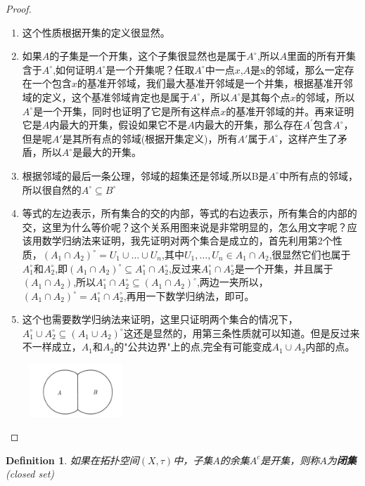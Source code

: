 \documentclass{article}
\newtheorem{definition}[theorem]{Definition}
\begin{document}
\begin{proof}
\begin{enumerate}
	\item 这个性质根据开集的定义很显然。
	\item 如果$A$的子集是一个开集，这个子集很显然也是属于$A^{\circ}$,所以$A$里面的所有开集含于$A^{\circ}$,如何证明$A^{\circ}$是一个开集呢？任取$A^{\circ}$中一点$x$,$A$是x的邻域，那么一定存在一个包含$x$的基准开邻域，我们最大基准开邻域是一个并集，根据基准开邻域的定义，这个基准邻域肯定也是属于$A^{\circ}$，所以$A^{\circ}$是其每个点$x$的邻域，所以$A^{\circ}$是一个开集，同时也证明了它是所有这样点$x$的基准开邻域的并。再来证明它是$A$内最大的开集，假设如果它不是$A$内最大的开集，那么存在$A^{'}$包含$A^{\circ}$，但是呢$A'$是其所有点的邻域(根据开集定义)，所有$A'$属于$A^{\circ}$，这样产生了矛盾，所以$A^{\circ}$是最大的开集。
	\item 根据邻域的最后一条公理，邻域的超集还是邻域,所以B是$A^{\circ}$中所有点的邻域，所以很自然的$A^{\circ} \subseteq B^{\circ}$
	\item 等式的左边表示，所有集合的交的内部，等式的右边表示，所有集合的内部的交，这里为什么等价呢？这个关系用图来说是非常明显的，怎么用文字呢？应该用数学归纳法来证明，我先证明对两个集合是成立的，首先利用第2个性质，${(A_1 \cap A_2)}^{\circ}=U_1 \cup \ldots \cup U_n $,其中$U_1,\ldots,U_n \in A_1 \cap A_2$,很显然它们也属于$A_1^{\circ}$和$A_2^{\circ}$,即${(A_1 \cap A_2)}^{\circ} \subseteq A_1^{\circ} \cap A_2^{\circ}$,反过来$A_1^{\circ} \cap A_2^{\circ}$是一个开集，并且属于$(A_1 \cap A_2)$,所以$A_1^{\circ} \cap A_2^{\circ} \subseteq {(A_1 \cap A_2)}^{\circ}$,两边一夹所以，${(A_1 \cap A_2)}^{\circ} = A_1^{\circ} \cap A_2^{\circ}$,再用一下数学归纳法，即可。
	\item 这个也需要数学归纳法来证明，这里只证明两个集合的情况下，$A_1^{\circ} \cup A_2^{\circ} \subseteq {(A_1 \cup A_2)}^{\circ}$这还是显然的，用第三条性质就可以知道。但是反过来不一样成立，$A_1$和$A_2$的"公共边界"上的点,完全有可能变成$A_1 \cup A_2$内部的点。
	\begin{center}
		\includegraphics[width=4cm, height=2cm]{images/A_B_same_border.png}
	\end{center}	
\end{enumerate}
\end{proof}

\begin{definition}
如果在拓扑空间$(X,\tau)$中，子集$A$的余集$A^{c}$是开集，则称$A$为\textbf{闭集}(closed set)
\end{definition}
\end{document}
